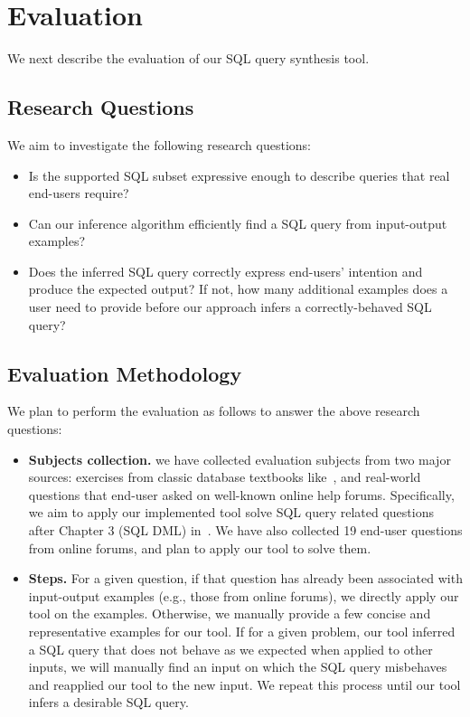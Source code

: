 
\section{Evaluation}
\label{sec:evaluation}

We next describe the evaluation of our SQL query synthesis tool.

\subsection{Research Questions}

We aim to investigate the following research questions:

\begin{itemize}
\item Is the supported SQL subset expressive enough to describe
queries that real end-users require?

\item Can our inference algorithm efficiently find a SQL query
from input-output examples?

\item Does the inferred SQL query correctly express end-users'
intention and produce the expected output? If not, how many
additional examples does a user need to provide before our
approach infers a correctly-behaved SQL query?

\end{itemize}

\subsection{Evaluation Methodology}

We plan to perform the evaluation as follows to answer the
above research questions:

\begin{itemize}
\item \textbf{Subjects collection.} we have collected evaluation
subjects from two major sources: exercises from classic
database textbooks like~\cite{cowbook}, and real-world questions
that end-user asked on well-known online help forums. Specifically,
we aim to apply our implemented tool solve SQL query related questions
after Chapter 3 (SQL DML) in~\cite{cowbook}. We have also collected
19 end-user questions from online forums, and plan to apply our
tool to solve them.

\item{\textbf{Steps.}} For a given question, if that question
has already been associated with input-output examples (e.g.,
those from online forums), we directly apply our tool on the examples.
Otherwise, we manually provide a few concise and representative
examples for our tool.
If for a given problem, our tool inferred
a SQL query that does not behave as we expected when applied
to other inputs, we will manually find an input on which the
SQL query misbehaves and reapplied our tool to the new input. We
repeat this process until our tool infers a desirable SQL query.
\end{itemize}

